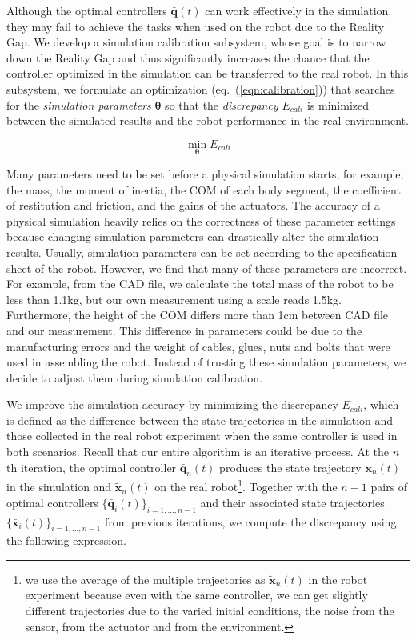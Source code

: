 Although the optimal controllers $\bar{\mathbf{q}}(t)$ can work effectively in the simulation, they may fail to achieve the tasks when used on the robot due to the Reality Gap. We develop a simulation calibration subsystem, whose goal is to narrow down the Reality Gap and thus significantly increases the chance that the controller optimized in the simulation can be transferred to the real robot. In this subsystem, we formulate an optimization (eq.~(\ref{eqn:calibration})) that searches for the \emph{simulation parameters} $\mathbf{\theta}$ so that the \emph{discrepancy} $E_{cali}$ is minimized between the simulated results and the robot performance in the real environment.

\begin{equation}
 \min_{\mathbf{\theta}} E_{cali}
\label{eqn:calibration}
\end{equation}

Many parameters need to be set before a physical simulation starts, for example, the mass, the moment of inertia, the COM of each body segment, the coefficient of restitution and friction, and the gains of the actuators. The accuracy of a physical simulation heavily relies on the correctness of these parameter settings because changing simulation parameters can drastically alter the simulation results. Usually, simulation parameters can be set according to the specification sheet of the robot. However, we find that many of these parameters are incorrect. For example, from the CAD file, we calculate the total mass of the robot to be less than 1.1kg, but our own measurement using a scale reads 1.5kg. Furthermore, the height of the COM differs more than 1cm between CAD file and our measurement. This difference in parameters could be due to the manufacturing errors and the weight of cables, glues, nuts and bolts that were used in assembling the robot. Instead of trusting these simulation parameters, we decide to adjust them during simulation calibration.

We improve the simulation accuracy by minimizing the discrepancy $E_{cali}$, which is defined as the difference between the state trajectories in the simulation and those collected in the real robot experiment when the same controller is used in both scenarios. Recall that our entire algorithm is an iterative process. At the $n$th iteration, the optimal controller $\bar{\mathbf{q}}_n(t)$ produces the state trajectory $\mathbf{x}_n(t)$ in the simulation and $\tilde{\mathbf{x}}_n(t)$ on the real robot\footnote{we use the average of the multiple trajectories as $\tilde{\mathbf{x}}_n(t)$ in the robot experiment because even with the same controller, we can get slightly different trajectories due to the varied initial conditions, the noise from the sensor, from the actuator and from the environment.}. Together with the $n-1$ pairs of optimal controllers $\{\bar{\mathbf{q}}_i(t)\}_{i=1,...,n-1}$ and their associated state trajectories $\{\bar{\mathbf{x}}_i(t)\}_{i=1,...,n-1}$ from previous iterations, we compute the discrepancy using the following expression. 

